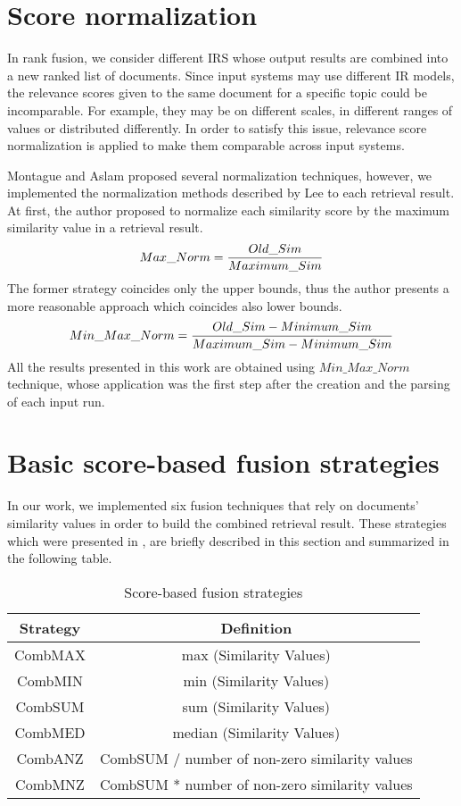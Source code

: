 \documentclass[letterpaper, 10 pt, conference]{ieeeconf}  %
\begin{document}
\section{Score normalization}
In rank fusion, we consider different IRS whose output results are combined into a new ranked list of documents. Since input systems may use different IR models, the relevance scores given to the same document for a specific topic could be incomparable.
For example, they may be on different scales, in different ranges of values or distributed differently. 
In order to satisfy this issue, relevance score normalization is applied to make them comparable across input systems. 

Montague and Aslam \cite{c4} proposed several normalization techniques, however, we implemented the normalization methods described by Lee \cite{c3} to each retrieval result. At first, the author proposed to normalize each similarity score by the maximum similarity value in a retrieval result.
$$
{Max\_Norm = {Old\_Sim \over Maximum\_Sim}}
$$ 
The former strategy coincides only the upper bounds, thus the author presents a more reasonable approach which coincides also lower bounds.
$$
{Min\_Max\_Norm = {{Old\_Sim - Minimum\_Sim} \over {Maximum\_Sim - Minimum\_Sim}}}
$$
All the results presented in this work are obtained using $Min\_Max\_Norm$ technique, whose application was the first step after the creation and the parsing of each input run. 

\section{Basic score-based fusion strategies}

In our work, we implemented six fusion techniques that rely on documents' similarity values in order to build the combined retrieval result. These strategies which were presented in \cite{c2}, are briefly described in this section and summarized in the following table.

\begin{table}[h]
\caption{Score-based fusion strategies}
\label{table_example}
\begin{center}
\begin{tabular}{|c|c|}
\hline
Strategy & Definition\\
\hline
CombMAX &  max (Similarity Values)\\
\hline
CombMIN & min (Similarity Values)\\
\hline
CombSUM & sum (Similarity Values)\\
\hline
CombMED & median (Similarity Values)\\
\hline
CombANZ & CombSUM / number of non-zero similarity values\\
\hline
CombMNZ & CombSUM * number of non-zero similarity values\\
\hline
\end{tabular}
\end{center}
\end{table}
\end{document}
